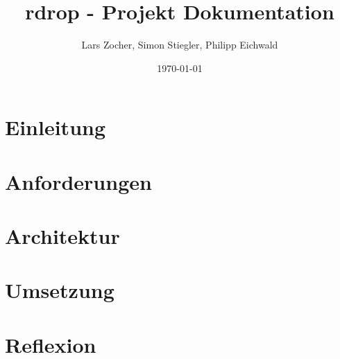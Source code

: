 \documentclass[a4paper, 12pt]{article}
\title{rdrop - Projekt Dokumentation}
\author{Lars Zocher, Simon Stiegler, Philipp Eichwald}
\date{\today}
\begin{document}
\maketitle

\section{Einleitung}


\section{Anforderungen}


\section{Architektur}


\section{Umsetzung}


\section{Reflexion}


\printbibliography
\end{document}
